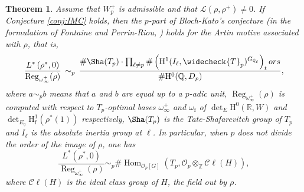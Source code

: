 \documentclass[12pt]{amsart}
\newcommand\bR{\mathbb{R}}
\newcommand\bZ{\mathbb{Z}}
\newcommand\bQ{\mathbb{Q}}
\newcommand\cL{\mathcal{L}}
\newcommand\cO{\mathcal{O}}
\DeclareMathOperator{\Hom}{Hom}
\DeclareMathOperator{\Reg}{Reg}
\newcommand{\HH}{\mathrm{H}}
\newcommand{\ff}{\mathrm{f}}
\theoremstyle{defstyle}
\theoremstyle{thmstyle}
\newtheorem{theorem}[subsubsection]{Theorem}
\begin{document}
\begin{theorem}\label{coro:formule_BK}
	Assume that $W_p^+$ is admissible and that $\cL(\rho,\rho^+)\neq 0$. If Conjecture \ref{conj:IMC} holds, then the $p$-part of Bloch-Kato's conjecture (in the formulation of Fontaine and Perrin-Riou, \cite[III, 4.5.2]{fontaineperrinriou}) holds for the Artin motive associated with $\rho$, that is,
	\begin{equation}\label{eq:formule_TNC}
		\dfrac{L^{*}\left(\rho^*,0\right)}{\Reg_{\omega_\infty^+}(\rho)} \, \sim_p \, \dfrac{\#\Sha({T}_p) \cdot \prod_{\ell\neq p}\#\left(\HH^1(I_\ell,\widecheck{T}_p)^{G_{\bQ_\ell}}\right)_\textrm{tors}}{\# \HH^0(\bQ,D_p)},
	\end{equation}
	where $a\sim_p b$ means that $a$ and $b$ are equal up to a $p$-adic unit, $\Reg_{\omega_\infty^+}(\rho)$ is computed with respect to $T_p$-optimal bases $\omega_\infty^+$ and $\omega_\ff$ of $\det_E \HH^0(\bR,W)$ and $\det_{E_\eta} \HH^1_\ff(\rho^*(1))$ respectively, $\Sha(T_p)$ is the Tate-Shafarevitch group of $T_p$ \cite[II,5.3.4]{fontaineperrinriou} and $I_\ell$ is the absolute inertia group at $\ell$. In particular, when $p$ does not divide the order of the image of $\rho$, one has 
	$$\dfrac{L^{*}\left(\rho^*,0\right)}{\Reg_{\omega_\infty^+}(\rho)}  \sim_p \#\Hom_{\cO_p[G]}(T_p,\cO_p \otimes_\bZ\mathscr{C}\!\ell(H)),$$
	where $\mathscr{C}\!\ell(H)$ is the ideal class group of $H$, the field out by $\rho$.
\end{theorem}
\end{document}
